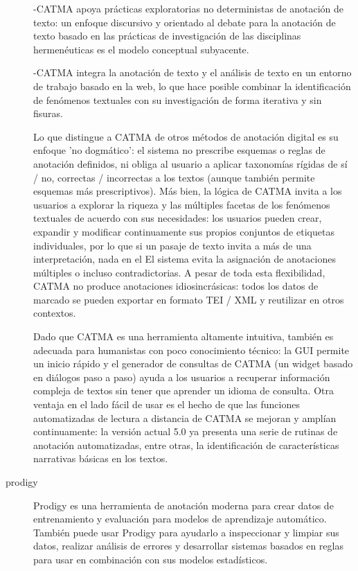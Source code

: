 \begin{description}
-CATMA apoya prácticas exploratorias no deterministas de anotación de texto: un enfoque discursivo y orientado al debate para la anotación de texto basado en las prácticas de investigación de las disciplinas hermenéuticas es el modelo conceptual subyacente.

-CATMA integra la anotación de texto y el análisis de texto en un entorno de trabajo basado en la web, lo que hace posible combinar la identificación de fenómenos textuales con su investigación de forma iterativa y sin fisuras.

Lo que distingue a CATMA de otros métodos de anotación digital es su enfoque 'no dogmático': el sistema no prescribe esquemas o reglas de anotación definidos, ni obliga al usuario a aplicar taxonomías rígidas de sí / no, correctas / incorrectas a los textos (aunque también permite esquemas más prescriptivos). Más bien, la lógica de CATMA invita a los usuarios a explorar la riqueza y las múltiples facetas de los fenómenos textuales de acuerdo con sus necesidades: los usuarios pueden crear, expandir y modificar continuamente sus propios conjuntos de etiquetas individuales, por lo que si un pasaje de texto invita a más de una interpretación, nada en el El sistema evita la asignación de anotaciones múltiples o incluso contradictorias. A pesar de toda esta flexibilidad, CATMA no produce anotaciones idiosincrásicas: todos los datos de marcado se pueden exportar en formato TEI / XML y reutilizar en otros contextos.

Dado que CATMA es una herramienta altamente intuitiva, también es adecuada para humanistas con poco conocimiento técnico: la GUI permite un inicio rápido y el generador de consultas de CATMA (un widget basado en diálogos paso a paso) ayuda a los usuarios a recuperar información compleja de textos sin tener que aprender un idioma de consulta. Otra ventaja en el lado fácil de usar es el hecho de que las funciones automatizadas de lectura a distancia de CATMA se mejoran y amplían continuamente: la versión actual 5.0 ya presenta una serie de rutinas de anotación automatizadas, entre otras, la identificación de características narrativas básicas en los textos.

\item[prodigy]

Prodigy es una herramienta de anotación moderna para crear datos de entrenamiento y evaluación para modelos de aprendizaje automático. También puede usar Prodigy para ayudarlo a inspeccionar y limpiar sus datos, realizar análisis de errores y desarrollar sistemas basados ​​en reglas para usar en combinación con sus modelos estadísticos.


\end{description}
